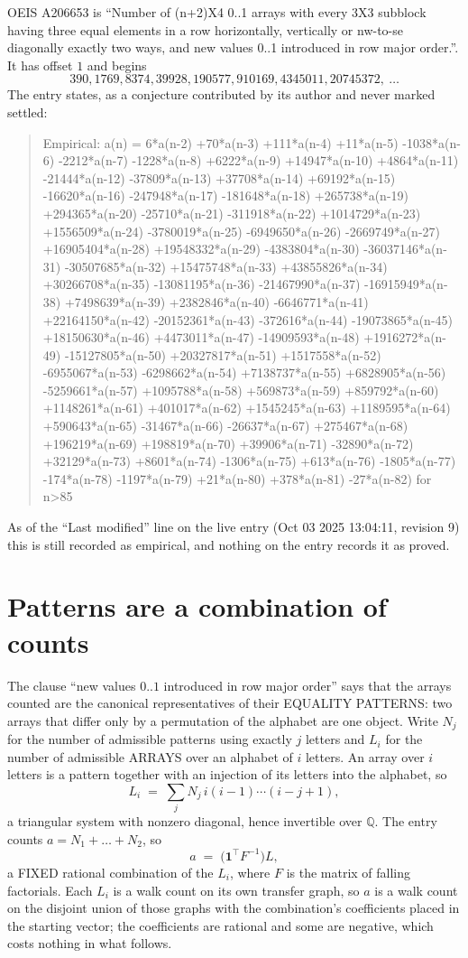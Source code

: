 \documentclass[11pt,a4paper]{article}
\theoremstyle{plain}
\theoremstyle{definition}
\begin{document}
OEIS A206653 is ``Number of (n+2)X4 0..1 arrays with every 3X3 subblock having three equal elements in a row horizontally, vertically or nw-to-se diagonally exactly two ways, and new values 0..1 introduced in row major order.''. It has offset $1$ and begins
\[
390, 1769, 8374, 39928, 190577, 910169, 4345011, 20745372,\ \dots
\]
The entry states, as a conjecture contributed by its author and never marked settled:
\begin{quote}
Empirical: a(n) = 6*a(n-2) +70*a(n-3) +111*a(n-4) +11*a(n-5) -1038*a(n-6) -2212*a(n-7) -1228*a(n-8) +6222*a(n-9) +14947*a(n-10) +4864*a(n-11) -21444*a(n-12) -37809*a(n-13) +37708*a(n-14) +69192*a(n-15) -16620*a(n-16) -247948*a(n-17) -181648*a(n-18) +265738*a(n-19) +294365*a(n-20) -25710*a(n-21) -311918*a(n-22) +1014729*a(n-23) +1556509*a(n-24) -3780019*a(n-25) -6949650*a(n-26) -2669749*a(n-27) +16905404*a(n-28) +19548332*a(n-29) -4383804*a(n-30) -36037146*a(n-31) -30507685*a(n-32) +15475748*a(n-33) +43855826*a(n-34) +30266708*a(n-35) -13081195*a(n-36) -21467990*a(n-37) -16915949*a(n-38) +7498639*a(n-39) +2382846*a(n-40) -6646771*a(n-41) +22164150*a(n-42) -20152361*a(n-43) -372616*a(n-44) -19073865*a(n-45) +18150630*a(n-46) +4473011*a(n-47) -14909593*a(n-48) +1916272*a(n-49) -15127805*a(n-50) +20327817*a(n-51) +1517558*a(n-52) -6955067*a(n-53) -6298662*a(n-54) +7138737*a(n-55) +6828905*a(n-56) -5259661*a(n-57) +1095788*a(n-58) +569873*a(n-59) +859792*a(n-60) +1148261*a(n-61) +401017*a(n-62) +1545245*a(n-63) +1189595*a(n-64) +590643*a(n-65) -31467*a(n-66) -26637*a(n-67) +275467*a(n-68) +196219*a(n-69) +198819*a(n-70) +39906*a(n-71) -32890*a(n-72) +32129*a(n-73) +8601*a(n-74) -1306*a(n-75) +613*a(n-76) -1805*a(n-77) -174*a(n-78) -1197*a(n-79) +21*a(n-80) +378*a(n-81) -27*a(n-82) for n>85
\end{quote}
As of the ``Last modified'' line on the live entry (Oct 03 2025 13:04:11, revision 9) this is still
recorded as empirical, and nothing on the entry records it as proved.

\section{Patterns are a combination of counts}

The clause ``new values $0..1$ introduced in row major order'' says that the arrays
counted are the canonical representatives of their EQUALITY PATTERNS: two arrays that differ
only by a permutation of the alphabet are one object. Write $N_j$ for the number of admissible
patterns using exactly $j$ letters and $L_i$ for the number of admissible ARRAYS over an
alphabet of $i$ letters. An array over $i$ letters is a pattern together with an injection of
its letters into the alphabet, so
\[
L_i\;=\;\sum_{j}N_j\,i(i-1)\cdots(i-j+1),
\]
a triangular system with nonzero diagonal, hence invertible over $\mathbb{Q}$. The entry
counts $a=N_1+\dots+N_{2}$, so
\[
a\;=\;\bigl(\mathbf{1}^{\!\top}F^{-1}\bigr)L ,
\]
a FIXED rational combination of the $L_i$, where $F$ is the matrix of falling factorials.
Each $L_i$ is a walk count on its own transfer graph, so $a$ is a walk count on the disjoint
union of those graphs with the combination's coefficients placed in the starting vector; the
coefficients are rational and some are negative, which costs nothing in what follows.
\end{document}
